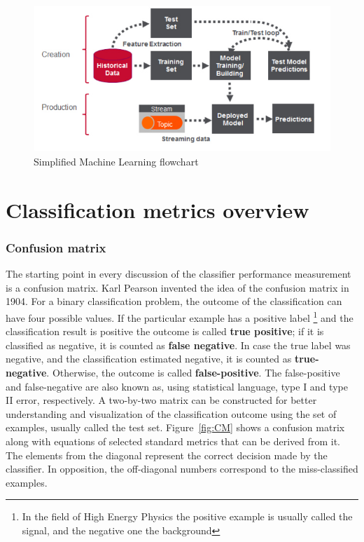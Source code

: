 \begin{figure}
\centering
\includegraphics{figures/MLflowchart.jpg}
\caption{Simplified Machine Learning flowchart
\label{fig:ML_flow}}
\end{figure}


\section{Classification metrics overview}
\subsubsection{Confusion matrix}
The starting point in every discussion of the classifier performance measurement is a confusion matrix. Karl Pearson invented the idea of the confusion matrix in 1904. For a binary classification problem, the outcome of the classification can have four possible values. If the particular example has a positive label \footnote{In the field of High Energy Physics the positive example is usually called the signal, and the negative one the background} and the classification result is positive the outcome is called \textbf{true positive}; if it is classified as negative, it is counted as \textbf{false negative}. In case the true label was negative, and the classification estimated negative, it is counted as \textbf{true-negative}. Otherwise, the outcome is called \textbf{false-positive}. The false-positive and false-negative are also known as, using statistical language, type I and type II error, respectively. 
A two-by-two matrix can be constructed for better understanding and visualization of the classification outcome using the set of examples, usually called the test set. Figure~\ref{fig:CM} shows a confusion matrix along with equations of selected standard metrics that can be derived from it. The elements from the diagonal represent the correct decision made by the classifier. In opposition, the off-diagonal numbers correspond to the miss-classified examples. 

